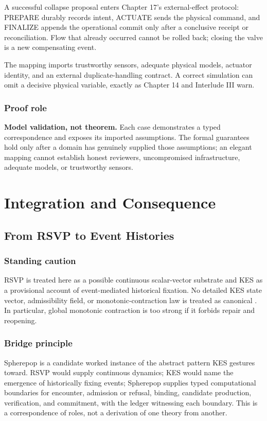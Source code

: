 \documentclass[11pt,openany]{book}
\begin{document}
A successful collapse proposal enters Chapter 17's external-effect protocol:
PREPARE durably records intent, ACTUATE sends the physical command, and
FINALIZE appends the operational commit only after a conclusive receipt or
reconciliation. Flow that already occurred cannot be rolled back; closing the
valve is a new compensating event.

The mapping imports trustworthy sensors, adequate physical models, actuator
identity, and an external duplicate-handling contract. A correct simulation
can omit a decisive physical variable, exactly as Chapter 14 and Interlude III
warn.

\section{Proof role}
\textbf{Model validation, not theorem.} Each case demonstrates a typed
correspondence and exposes its imported assumptions. The formal guarantees
hold only after a domain has genuinely supplied those assumptions; an elegant
mapping cannot establish honest reviewers, uncompromised infrastructure,
adequate models, or trustworthy sensors.

\part{Integration and Consequence}

\chapter{From RSVP to Event Histories}
\section{Standing caution}
RSVP is treated here as a possible continuous scalar-vector substrate and KES
as a provisional account of event-mediated historical fixation. No detailed
KES state vector, admissibility field, or monotonic-contraction law is treated
as canonical \cite{flyxion-rsvp-kes}. In particular, global monotonic contraction is too strong if it
forbids repair and reopening.

\section{Bridge principle}
Spherepop is a candidate worked instance of the abstract pattern KES gestures
toward. RSVP would supply continuous dynamics; KES would name the emergence of
historically fixing events; Spherepop supplies typed computational boundaries
for encounter, admission or refusal, binding, candidate production,
verification, and commitment, with the ledger witnessing each boundary. This
is a correspondence of roles, not a derivation of one theory from another.
\end{document}
